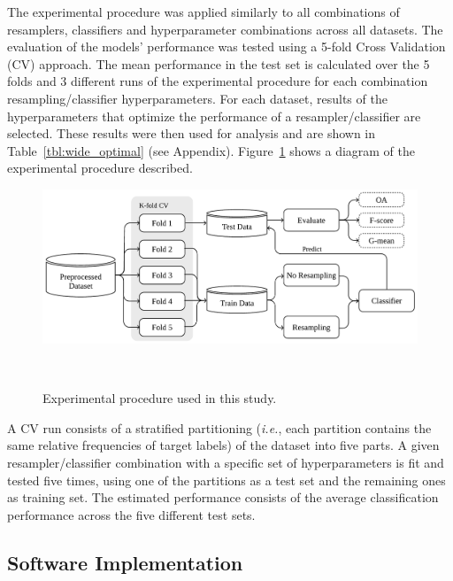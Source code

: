 \documentclass[parskip=full]{scrartcl}
\begin{document}
The experimental procedure was applied similarly to all combinations of
resamplers, classifiers and hyperparameter combinations across all datasets.
The evaluation of the models' performance was tested using a 5-fold Cross
Validation (CV) approach. The mean performance in the test set is calculated
over the 5 folds and 3 different runs of the experimental procedure for each
combination resampling/classifier hyperparameters. For each dataset, results
of the hyperparameters that optimize the performance of a resampler/classifier
are selected. These results were then used for analysis and are shown in
Table~\ref{tbl:wide_optimal} (see Appendix).
Figure~\ref{fig:experimental_procedure} shows a diagram of the experimental
procedure described.

\begin{figure}
	\centering
	\includegraphics[width=.8\linewidth]{../analysis/experimental_procedure}
    \caption{Experimental procedure used in this study.
    }~\label{fig:experimental_procedure}
\end{figure}

A CV run consists of a stratified partitioning (\textit{i.e.}, each partition
contains the same relative frequencies of target labels) of the dataset into
five parts. A given resampler/classifier combination with a specific set of
hyperparameters is fit and tested five times, using one of the partitions as a
test set and the remaining ones as training set. The estimated performance
consists of the average classification performance across the five different
test sets. 

\subsection{Software Implementation}~\label{sec:software_implementation}
\end{document}
